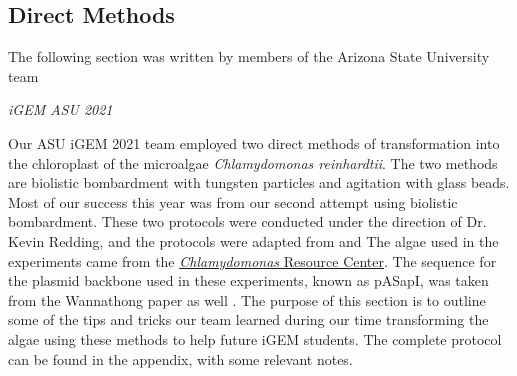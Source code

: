 \subsection{Direct Methods}
\epigraph{The following section was written by members of the Arizona State University team}{\textit{iGEM ASU 2021}}
\noindent
Our ASU iGEM 2021 team employed two direct methods of transformation into the chloroplast of the microalgae \textit{Chlamydomonas reinhardtii}. The two methods are biolistic bombardment with tungsten particles and agitation with glass beads. Most of our success this year was from our second attempt using biolistic bombardment. These two protocols were conducted under the direction of Dr. Kevin Redding, and the protocols were adapted from \parencite{Boynton1988} and \parencite{Wannathong2016} The algae used in the experiments came from the \href{https://www.chlamycollection.org/} {\textit{Chlamydomonas} Resource Center}. The sequence for the plasmid backbone used in these experiments, known as pASapI, was taken from the Wannathong paper as well \parencite{Wannathong2016}. The purpose of this section is to outline some of the tips and tricks our team learned during our time transforming the algae using these methods to help future iGEM students. The complete protocol can be found in the appendix, with some relevant notes. 


